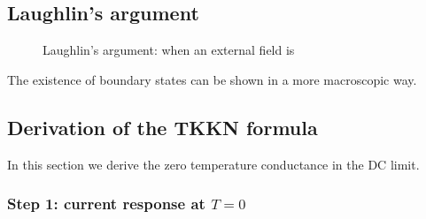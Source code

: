 \documentclass[hyperref, a4paper]{article}
\begin{document}
\subsection{Laughlin's argument}

\begin{figure}
    \centering
    
    \caption{Laughlin's argument: when an external field is }
\end{figure}

The existence of boundary states can be shown in a more macroscopic way.

\subsection{Derivation of the TKKN formula}

In this section we derive the zero temperature conductance 
in the DC limit.

\subsubsection{Step 1: current response at $T = 0$}
\end{document}
